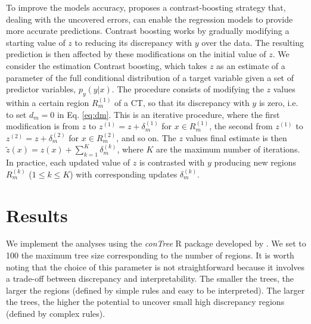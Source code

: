 \documentclass[fleqn,10pt]{wlscirep}
\begin{document}
To improve the models accuracy, \cite{Friedman2020} proposes a contrast-boosting strategy that, dealing with the uncovered errors, can enable the regression models to provide more accurate predictions. Contrast boosting works by gradually modifying a starting value of $z$ to reducing its discrepancy with $y$ over the data. The resulting prediction is then affected by these modifications on the initial value of $z$.
We consider the estimation Contrast boosting, which takes $z$ as an estimate of a parameter of the full conditional distribution of a target variable given a set of predictor variables, $p_y(y | x)$.
The procedure consists of modifying the $z$ values within a certain region $R_m^{(1)}$ of a CT, so that its discrepancy with $y$ is zero, i.e. to set $d_m=0$ in Eq. \ref{eq:dm}.
This is an iterative procedure, where the first modification is from $z$ to $z^{(1)}=z+\delta^{(1)}_m$ for $x\in R^{(1)}_m$, the second from $z^{(1)}$ to $z^{(2)}=z+\delta^{(2)}_m$ for $x\in R^{(2)}_m$, and so on.
The $z$ values final estimate is then $\tilde{z}(x)=z(x)+\sum_{k=1}^{K}\delta_{m}^{(k)}$, where $K$ are the maximum number of iterations. In practice, each updated value of $z$ is contrasted with $y$ producing new regions $R^{(k)}_m$ ($1\leq k\leq K$) with corresponding updates $\delta_{m}^{(k)}$.

\section*{Results}

We implement the analyses using the \textit{conTree} R package developed by \cite{FriedmanNarasimhan2020}.
We set to 100 the maximum tree size corresponding to the number of regions. It is worth noting that the choice of this parameter is not straightforward because it involves a trade-off between discrepancy and interpretability. The smaller the trees, the larger the regions (defined by simple rules and easy to be interpreted). The larger the trees, the higher the potential to uncover small high discrepancy regions (defined by complex rules).
\end{document}
